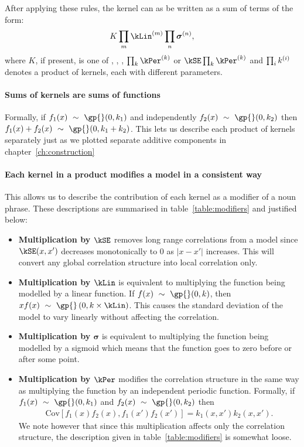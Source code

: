 After applying these rules, the kernel can as be written as a sum of terms of the form:
\begin{align*}
K \prod_m \kLin^{(m)} \prod_n \boldsymbol\sigma^{(n)},
\label{eq:sop}
\end{align*}
where $K$, if present, is one of \kWN, \kC, \kSE, $\prod_k \kPer^{(k)}$ or $\kSE \prod_k \kPer^{(k)}$
and $\prod_ik^{(i)}$ denotes a product of kernels, each with different parameters.


\paragraph{Sums of kernels are sums of functions}
Formally, if $f_1(x) \dist \gp{}(0, \kernel_1)$ and independently $f_2(x) \dist \gp{}(0, \kernel_2)$ then ${f_1(x) + f_2(x) \dist \gp{}(0, \kernel_1 + \kernel_2)}$.
This lets us describe each product of kernels separately just as we plotted separate additive components in chapter~\ref{ch:construction}

\paragraph{Each kernel in a product modifies a model in a consistent way}
This allows us to describe the contribution of each kernel as a modifier of a noun phrase.
These descriptions are summarised in table~\ref{table:modifiers} and justified below:

\begin{itemize}
\item {\bf Multiplication by $\kSE$} removes long range correlations from a model since $\kSE(x,x')$ decreases monotonically to 0 as $|x - x'|$ increases.
This will convert any global correlation structure into local correlation only.
\item {\bf Multiplication by $\kLin$} is equivalent to multiplying the function being modelled by a linear function.
If $f(x) \dist \gp{}(0, \kernel)$, then $xf(x) \dist \gp{}\left(0, k \times \kLin \right)$.
This causes the standard deviation of the model to vary linearly without affecting the correlation.
\item {\bf Multiplication by $\boldsymbol\sigma$} is equivalent to multiplying the function being modelled by a sigmoid which means that the function goes to zero before or after some point.
\item {\bf Multiplication by $\kPer$}
modifies the correlation structure in the same way as multiplying the function by an independent periodic function.
Formally, if ${f_1(x) \dist \gp{}(0, \kernel_1)}$ and ${f_2(x) \dist \gp{}(0, \kernel_2)}$ then
\begin{align}
{\textrm{Cov} \left[f_1(x)f_2(x), f_1(x')f_2(x') \right] = k_1(x,x')k_2(x,x')}.\nonumber
\end{align}
We note however that since this multiplication affects only the correlation structure, the description given in table~\ref{table:modifiers} is somewhat loose.
\end{itemize}

